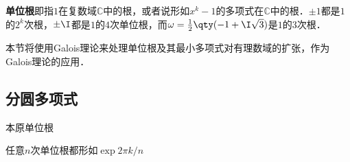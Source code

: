 



\textbf{单位根}即指$1$在复数域$\mathbb{C}$中的根，或者说形如$x^k-1$的多项式在$\mathbb{C}$中的根．$\pm 1$都是$1$的$2^k$次根，$\pm \I$都是$1$的$4$次单位根，而$\omega=\frac{1}{2}\qty(-1+\I\sqrt{3})$是$1$的$3$次根．

本节将使用Galois理论来处理单位根及其最小多项式对有理数域的扩张，作为Galois理论的应用．


\subsection{分圆多项式}

\begin{definition}{本原单位根}

任意$n$次单位根都形如$\exp{2\pi k/n}$

\end{definition}


















